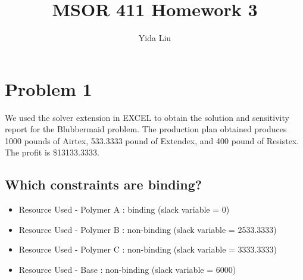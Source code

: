 \documentclass[11pt]{article}
\begin{document}
\author{Yida Liu}
\title{MSOR 411 Homework 3}
\maketitle

\section{Problem 1}

We used the solver extension in EXCEL to obtain the solution and sensitivity report for the Blubbermaid problem. The production plan obtained produces 1000 pounds of Airtex, 533.3333 pound of Extendex, and 400 pound of Resistex. The profit is \$13133.3333.

\subsection{Which constraints are binding?}
    \begin{itemize}
        \item Resource Used - Polymer A : binding (slack variable = 0)
        \item Resource Used - Polymer B : non-binding (slack variable = 2533.3333)
        \item Resource Used - Polymer C : non-binding (slack variable = 3333.3333)
        \item Resource Used - Base      : non-binding (slack variable = 6000)
    \end{itemize}
    
\end{document}

